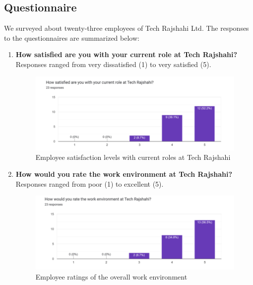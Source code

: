 \documentclass[12pt,a4paper]{article}
\begin{document}
\subsection{Questionnaire}
We surveyed about twenty-three employees of Tech Rajshahi Ltd. The responses to the questionnaires are summarized below:

\begin{enumerate}
    \item \textbf{How satisfied are you with your current role at Tech Rajshahi?}  Responses ranged from very dissatisfied (1) to very satisfied (5).
    \begin{figure}[H]
        \centering
        \includegraphics[width=\textwidth]{Fig/role.png}
        \caption{Employee satisfaction levels with current roles at Tech Rajshahi}
        \label{fig:role_satisfaction}
    \end{figure}

    \item \textbf{How would you rate the work environment at Tech Rajshahi?}  Responses ranged from poor (1) to excellent (5).
    \begin{figure}[H]
        \centering
        \includegraphics[width=\textwidth]{Fig/we.png}
        \caption{Employee ratings of the overall work environment}
        \label{fig:work_environment}
    \end{figure}


\end{enumerate}
\end{document}
